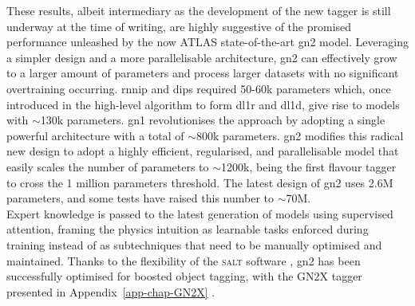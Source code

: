 These results, albeit intermediary as the development of the new tagger is still underway at the time of writing, are highly suggestive of the promised performance unleashed by the now ATLAS state-of-the-art \gls{gn2} model. Leveraging a simpler design and a more parallelisable architecture, \gls{gn2} can effectively grow to a larger amount of parameters and process larger datasets with no significant overtraining occurring. \gls{rnnip} and \gls{dips} required 50-60k parameters which, once introduced in the high-level algorithm to form \gls{dl1r} and \gls{dl1d}, give rise to models with $\sim$130k parameters. \gls{gn1} revolutionises the approach by adopting a single powerful architecture with a total of $\sim$800k parameters. \gls{gn2} modifies this radical new design to adopt a highly efficient, regularised, and parallelisable model that easily scales the number of parameters to $\sim$1200k, being the first flavour tagger to cross the 1 million parameters threshold. The latest design of \gls{gn2} uses 2.6M parameters, and some tests have raised this number to $\sim$70M. \\

Expert knowledge is passed to the latest generation of models using supervised attention, framing the physics intuition as learnable tasks enforced during training instead of as subtechniques that need to be manually optimised and maintained. Thanks to the flexibility of the \textsc{salt} software \cite{SaltCite}, \gls{gn2} has been successfully optimised for boosted object tagging, with the GN2X tagger presented in Appendix~\ref{app-chap-GN2X} \cite{ATL-PHYS-PUB-2023-021}.
